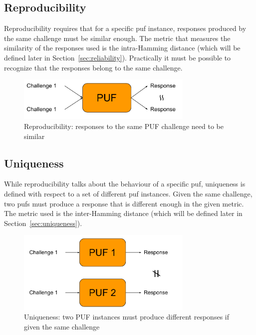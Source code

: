 \subsection*{Reproducibility}\label{sec:reproducibility}

Reproducibility requires that for a specific \gls{puf} instance, responses produced by the same challenge must be similar enough. The metric that measures the similarity of the responses used is the intra-Hamming distance (which will be defined later in Section~\ref{sec:reliability}). Practically it must be possible to recognize that the responses belong to the same challenge.

\begin{figure}[h!]
    \centering
    \captionsetup{justification=centering,margin=0.5cm}
    \includegraphics[width=0.75\textwidth]{images/reproducibility}
    \caption[Reproducibility: responses to the same PUF challenge need to be similar]{Reproducibility: responses to the same PUF challenge need to be similar~\cite{Kodytek2017}}
    \label{fig:reproducibility}
\end{figure}

\subsection*{Uniqueness}

While reproducibility talks about the behaviour of a specific \gls{puf}, uniqueness is defined with respect to a set of different \gls{puf} instances. Given the same challenge, two \glspl{puf} must produce a response that is different enough in the given metric. The metric used is the inter-Hamming distance (which will be defined later in Section~\ref{sec:uniqueness}).

\begin{figure}[ht!]
    \centering
    \captionsetup{justification=centering,margin=0.5cm}
    \includegraphics[width=0.75\textwidth]{images/uniqueness}
    \caption[Uniqueness: two PUF instances must produce different responses if given the same challenge]{Uniqueness: two PUF instances must produce different responses if given the same challenge~\cite{Kodytek2017}}
    \label{fig:uniqueness}
\end{figure}

